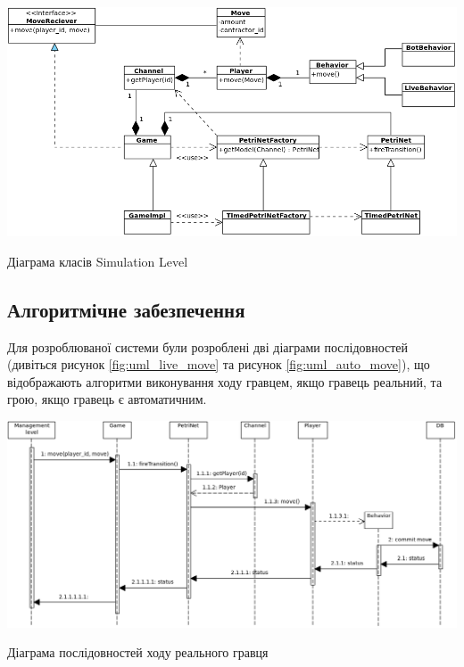\begin{stdfigure}
    \includegraphics[width=7in]{images/uml/simulation_level.png}
    \caption{Діаграма класів Simulation Level}
    \label{fig:uml_simulation}
\end{stdfigure}   

\subsection{Алгоритмічне забезпечення}
Для розроблюваної системи були розроблені дві діаграми послідовностей (дивіться рисунок \ref{fig:uml_live_move} та рисунок \ref{fig:uml_auto_move}), що відображають алгоритми виконування ходу гравцем, якщо гравець реальний, та грою, якщо гравець є автоматичним.
\begin{stdfigure}
    \includegraphics[width=7in]{images/uml/live_move.png}
    \caption{Діаграма послідовностей ходу реального гравця}
    \label{fig:uml_live_move}
\end{stdfigure}   

